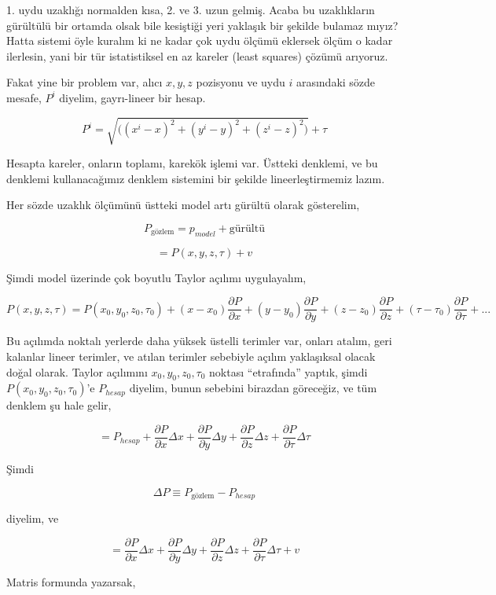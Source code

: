 \documentclass[12pt,fleqn]{article}\usepackage{../../common}
\begin{document}
1. uydu uzaklığı normalden kısa, 2. ve 3. uzun gelmiş. Acaba bu
uzaklıkların gürültülü bir ortamda olsak bile kesiştiği yeri yaklaşık bir
şekilde bulamaz mıyız? Hatta sistemi öyle kuralım ki ne kadar çok uydu
ölçümü eklersek ölçüm o kadar ilerlesin, yani bir tür istatistiksel en az
kareler (least squares) çözümü arıyoruz.

Fakat yine bir problem var, alıcı $x,y,z$ pozisyonu ve uydu $i$ arasındaki
sözde mesafe, $P^i$ diyelim, gayrı-lineer bir hesap.

$$ 
P^i = \sqrt{ \big( (x^i-x)^2 + (y^i-y)^2 + (z^i-z)^2  \big) } + \tau
$$

Hesapta kareler, onların toplamı, karekök işlemi var. Üstteki denklemi, ve
bu denklemi kullanacağımız denklem sistemini bir şekilde lineerleştirmemiz
lazım.

Her sözde uzaklık ölçümünü üstteki model artı gürültü olarak gösterelim,

$$ P_{\textrm{gözlem}} = p_{model} + \textrm{gürültü} $$

$$ = P(x,y,z,\tau) + v $$

Şimdi model üzerinde çok boyutlu Taylor açılımı uygulayalım, 

$$ 
P(x,y,z,\tau) = P(x_0,y_0,z_0,\tau_0) + 
(x-x_0)\frac{\partial P}{\partial x} + 
(y-y_0)\frac{\partial P}{\partial y} + 
(z-z_0)\frac{\partial P}{\partial z} + 
(\tau-\tau_0)\frac{\partial P}{\partial \tau}  + ...
$$

Bu açılımda noktalı yerlerde daha yüksek üstelli terimler var, onları
atalım, geri kalanlar lineer terimler, ve atılan terimler sebebiyle açılım
yaklaşıksal olacak doğal olarak. Taylor açılımını $x_0,y_0,z_0,\tau_0$
noktası ``etrafında'' yaptık, şimdi $P(x_0,y_0,z_0,\tau_0)$'e $P_{hesap}$
diyelim, bunun sebebini birazdan göreceğiz, ve tüm denklem şu hale gelir,

$$ 
= P_{hesap} + \frac{\partial P}{\partial x} \Delta x + 
\frac{\partial P}{\partial y} \Delta y + 
\frac{\partial P}{\partial z} \Delta z + 
\frac{\partial P}{\partial \tau} \Delta \tau 
$$

Şimdi

$$ \Delta P \equiv P_{\textrm{gözlem}} - P_{hesap} $$

diyelim, ve

$$ 
= \frac{\partial P}{\partial x} \Delta x + 
\frac{\partial P}{\partial y} \Delta y + 
\frac{\partial P}{\partial z} \Delta z + 
\frac{\partial P}{\partial \tau} \Delta \tau 
+ v
$$

Matris formunda yazarsak, 
\end{document}
